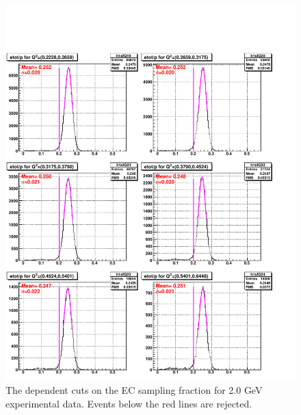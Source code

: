 \begin{figure}[H]%
\centering
\leavevmode \includegraphics[width=1.0\textwidth]{figuresEG4/FigCuts/ecCuts_sfOneD_Eb2_4ThN.pdf}  %
\caption[EC sampling fraction cut (Exp.)]{The \qsqs dependent cuts on the EC sampling fraction for 2.0 GeV experimental data. Events below the red lines are rejected.}
\label{ecSfExp6}
\end{figure}




